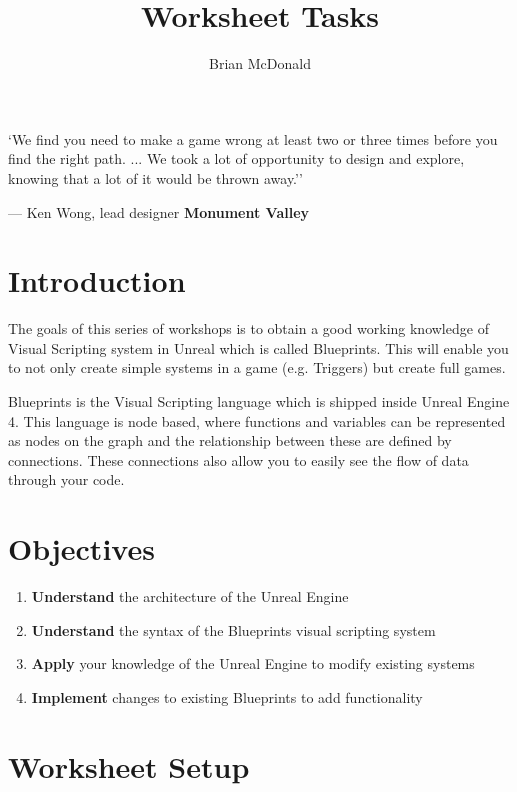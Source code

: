 \documentclass{../../../fal_assignment}
\title{Worksheet Tasks}
\author{Brian McDonald} %
\begin{document}
\maketitle

\begin{marginquote}
`We find you need to make a game wrong at least two or three times before you find the right path. ...
We took a lot of opportunity to design and explore, knowing that a lot of it would be thrown away.''
\par --- Ken Wong, lead designer \textbf{Monument Valley}
\end{marginquote}


\section*{Introduction}
The goals of this series of workshops is to obtain a good working knowledge of Visual Scripting system in Unreal which is called Blueprints. This will enable you to not only create simple systems in a game (e.g. Triggers) but create full games.

Blueprints is the Visual Scripting language which is shipped inside Unreal Engine 4. This language is node based, where functions and variables can be represented as nodes on the graph and the relationship between these are defined by connections. These connections also allow you to easily see the flow of data through your code.

\section*{Objectives}
\begin{enumerate}[label=(\Alph*)]
	\item \textbf{Understand} the architecture of the Unreal Engine
	\item \textbf{Understand} the syntax of the Blueprints visual scripting system
	\item \textbf{Apply} your knowledge of the Unreal Engine to modify existing systems
	\item \textbf{Implement} changes to existing Blueprints to add functionality
\end{enumerate}

\section*{Worksheet Setup}
\end{document}
